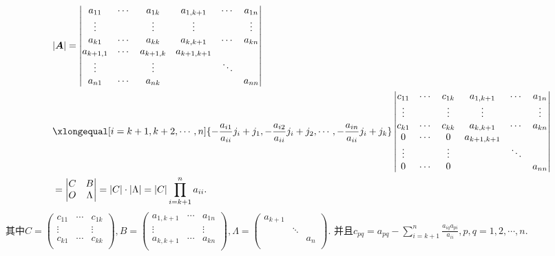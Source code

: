 \documentclass[lang=cn,newtx,10pt,scheme=chinese]{elegantbook}
\begin{document}
\begin{solution}
\begin{align*}
&|\boldsymbol{A}|=\left| \begin{matrix}
a_{11}&		\cdots&		a_{1k}&		a_{1,k+1}&		\cdots&		a_{1n}\\
\vdots&		&		\vdots&		\vdots&		&		\vdots\\
a_{k1}&		\cdots&		a_{kk}&		a_{k,k+1}&		\cdots&		a_{kn}\\
a_{k+1,1}&		\cdots&		a_{k+1,k}&		a_{k+1,k+1}&		&		\\
\vdots&		&		\vdots&		&		\ddots&		\\
a_{n1}&		\cdots&		a_{nk}&		&		&		a_{nn}\\
\end{matrix} \right|
\\
&\xlongequal[i=k+1,k+2,\cdots ,n]{-\frac{a_{i1}}{a_{ii}}j_i+j_1,-\frac{a_{i2}}{a_{ii}}j_i+j_2,\cdots ,-\frac{a_{in}}{a_{ii}}j_i+j_k}\left| \begin{matrix}
c_{11}&		\cdots&		c_{1k}&		a_{1,k+1}&		\cdots&		a_{1n}\\
\vdots&		&		\vdots&		\vdots&		&		\vdots\\
c_{k1}&		\cdots&		c_{kk}&		a_{k,k+1}&		\cdots&		a_{kn}\\
0&		\cdots&		0&		a_{k+1,k+1}&		&		\\
\vdots&		&		\vdots&		&		\ddots&		\\
0&		\cdots&		0&		&		&		a_{nn}\\
\end{matrix} \right|
\\
&=\left| \begin{matrix}
C&		B\\
O&		\Lambda\\
\end{matrix} \right|=|C|\cdot |\Lambda |=|C|\prod_{i=k+1}^n{a_{ii}}.
\end{align*}
其中$C=\left( \begin{matrix}
c_{11}&		\cdots&		c_{1k}\\
\vdots&		&		\vdots\\
c_{k1}&		\cdots&		c_{kk}\\
\end{matrix} \right) ,B=\left( \begin{matrix}
a_{1,k+1}&		\cdots&		a_{1n}\\
\vdots&		&		\vdots\\
a_{k,k+1}&		\cdots&		a_{kn}\\
\end{matrix} \right) ,\Lambda =\left( \begin{matrix}
a_{k+1}&		&		\\
&		\ddots&		\\
&		&		a_n\\
\end{matrix} \right).$
并且$c_{pq}=a_{pq}-\sum_{i=k+1}^n{\frac{a_{iq}a_{pi}}{a_{ii}}},p,q=1,2,\cdots ,n$.
\end{solution}
\end{document}
